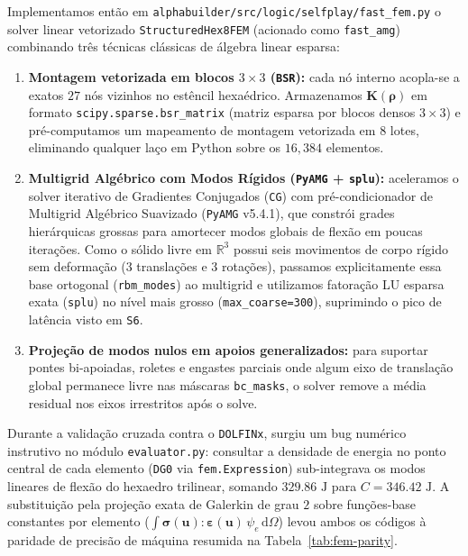 \documentclass[11pt,a4paper]{article}
\begin{document}
Implementamos então em \texttt{alphabuilder/src/logic/selfplay/fast\_fem.py} o solver linear vetorizado \texttt{StructuredHex8FEM} (acionado como \texttt{fast\_amg}) combinando três técnicas clássicas de álgebra linear esparsa:
\begin{enumerate}
\item \textbf{Montagem vetorizada em blocos $3\times 3$ (\texttt{BSR}):} cada nó interno acopla-se a exatos $27$ nós vizinhos no estêncil hexaédrico. Armazenamos $\mathbf{K}(\boldsymbol{\rho})$ em formato \texttt{scipy.sparse.bsr\_matrix} (matriz esparsa por blocos densos $3\times 3$) e pré-computamos um mapeamento de montagem vetorizada em $8$ lotes, eliminando qualquer laço em Python sobre os $16{,}384$ elementos.
\item \textbf{Multigrid Algébrico com Modos Rígidos (\texttt{PyAMG} + \texttt{splu}):} aceleramos o solver iterativo de Gradientes Conjugados (\texttt{CG}) com pré-condicionador de Multigrid Algébrico Suavizado (\texttt{PyAMG} v5.4.1), que constrói grades hierárquicas grossas para amortecer modos globais de flexão em poucas iterações. Como o sólido livre em $\mathbb{R}^3$ possui seis movimentos de corpo rígido sem deformação ($3$ translações e $3$ rotações), passamos explicitamente essa base ortogonal (\texttt{rbm\_modes}) ao multigrid e utilizamos fatoração LU esparsa exata (\texttt{splu}) no nível mais grosso (\texttt{max\_coarse=300}), suprimindo o pico de latência visto em \texttt{S6}.
\item \textbf{Projeção de modos nulos em apoios generalizados:} para suportar pontes bi-apoiadas, roletes e engastes parciais onde algum eixo de translação global permanece livre nas máscaras \texttt{bc\_masks}, o solver remove a média residual nos eixos irrestritos após o solve.
\end{enumerate}

Durante a validação cruzada contra o \texttt{DOLFINx}, surgiu um bug numérico instrutivo no módulo \texttt{evaluator.py}: consultar a densidade de energia no ponto central de cada elemento (\texttt{DG0} via \texttt{fem.Expression}) sub-integrava os modos lineares de flexão do hexaedro trilinear, somando $329.86\text{ J}$ para $C = 346.42\text{ J}$. A substituição pela projeção exata de Galerkin de grau $2$ sobre funções-base constantes por elemento ($\int \boldsymbol{\sigma}(\mathbf{u}):\boldsymbol{\varepsilon}(\mathbf{u})\,\psi_e\,\mathrm{d}\Omega$) levou ambos os códigos à paridade de precisão de máquina resumida na Tabela~\ref{tab:fem-parity}.
\end{document}
